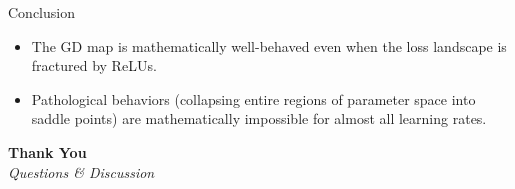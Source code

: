 \documentclass[10pt, aspectratio=169]{beamer}
\theoremstyle{definition}
\begin{document}
\begin{frame}{Conclusion}
    \begin{itemize}
        \item The GD map is mathematically well-behaved even when the loss landscape is fractured by ReLUs.
        \item Pathological behaviors (collapsing entire regions of parameter space into saddle points) are mathematically impossible for almost all learning rates.
    \end{itemize}
\end{frame}

\begin{frame}
    \begin{center}
        \Huge \textbf{Thank You} \\
        \vspace{1cm}
        \Large \textit{Questions \& Discussion}
    \end{center}
\end{frame}
\end{document}
